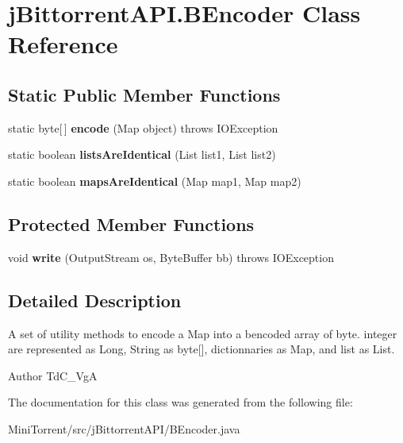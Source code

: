 \hypertarget{classj_bittorrent_a_p_i_1_1_b_encoder}{
\section{jBittorrentAPI.BEncoder Class Reference}
\label{classj_bittorrent_a_p_i_1_1_b_encoder}
}
\subsection*{Static Public Member Functions}
\begin{DoxyCompactItemize}
\item 
\hypertarget{classj_bittorrent_a_p_i_1_1_b_encoder_ac77cd232c0cb6540f4301acd947c2781}{
static byte\mbox{[}$\,$\mbox{]} {\bfseries encode} (Map object)  throws IOException }
\label{classj_bittorrent_a_p_i_1_1_b_encoder_ac77cd232c0cb6540f4301acd947c2781}

\item 
\hypertarget{classj_bittorrent_a_p_i_1_1_b_encoder_a30a443da94eda42a8a3f28262a820f68}{
static boolean {\bfseries listsAreIdentical} (List list1, List list2)}
\label{classj_bittorrent_a_p_i_1_1_b_encoder_a30a443da94eda42a8a3f28262a820f68}

\item 
\hypertarget{classj_bittorrent_a_p_i_1_1_b_encoder_a6d435e1f9129f887b9191385e24d8f21}{
static boolean {\bfseries mapsAreIdentical} (Map map1, Map map2)}
\label{classj_bittorrent_a_p_i_1_1_b_encoder_a6d435e1f9129f887b9191385e24d8f21}

\end{DoxyCompactItemize}
\subsection*{Protected Member Functions}
\begin{DoxyCompactItemize}
\item 
\hypertarget{classj_bittorrent_a_p_i_1_1_b_encoder_aa980bb9827af6b4d451dc4c4a331179a}{
void {\bfseries write} (OutputStream os, ByteBuffer bb)  throws IOException }
\label{classj_bittorrent_a_p_i_1_1_b_encoder_aa980bb9827af6b4d451dc4c4a331179a}

\end{DoxyCompactItemize}


\subsection{Detailed Description}
A set of utility methods to encode a Map into a bencoded array of byte. integer are represented as Long, String as byte\mbox{[}\mbox{]}, dictionnaries as Map, and list as List.

\begin{DoxyAuthor}{Author}
TdC\_\-VgA 
\end{DoxyAuthor}


The documentation for this class was generated from the following file:\begin{DoxyCompactItemize}
\item 
MiniTorrent/src/jBittorrentAPI/BEncoder.java\end{DoxyCompactItemize}
